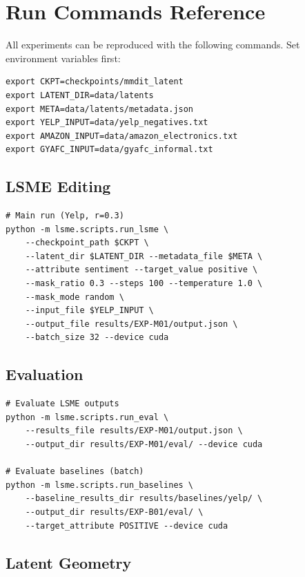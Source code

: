\documentclass{article}
\begin{document}
\section{Run Commands Reference}
\label{sec:commands}

All experiments can be reproduced with the following commands. Set environment variables first:

\begin{verbatim}
export CKPT=checkpoints/mmdit_latent
export LATENT_DIR=data/latents
export META=data/latents/metadata.json
export YELP_INPUT=data/yelp_negatives.txt
export AMAZON_INPUT=data/amazon_electronics.txt
export GYAFC_INPUT=data/gyafc_informal.txt
\end{verbatim}

\subsection{LSME Editing}

\begin{verbatim}
# Main run (Yelp, r=0.3)
python -m lsme.scripts.run_lsme \
    --checkpoint_path $CKPT \
    --latent_dir $LATENT_DIR --metadata_file $META \
    --attribute sentiment --target_value positive \
    --mask_ratio 0.3 --steps 100 --temperature 1.0 \
    --mask_mode random \
    --input_file $YELP_INPUT \
    --output_file results/EXP-M01/output.json \
    --batch_size 32 --device cuda
\end{verbatim}

\subsection{Evaluation}

\begin{verbatim}
# Evaluate LSME outputs
python -m lsme.scripts.run_eval \
    --results_file results/EXP-M01/output.json \
    --output_dir results/EXP-M01/eval/ --device cuda

# Evaluate baselines (batch)
python -m lsme.scripts.run_baselines \
    --baseline_results_dir results/baselines/yelp/ \
    --output_dir results/EXP-B01/eval/ \
    --target_attribute POSITIVE --device cuda
\end{verbatim}

\subsection{Latent Geometry}
\end{document}
